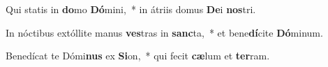 \item Qui statis in \textbf{do}mo \textbf{Dó}mini,~* in átriis domus \textbf{De}i \textbf{nos}tri.
\item In nóctibus extóllite manus \textbf{ves}tras in \textbf{sanc}ta,~* et bene\textbf{dí}cite \textbf{Dó}minum.
\item Benedícat te Dómi\textbf{nus} ex \textbf{Si}on,~* qui fecit \textbf{cæ}lum et \textbf{ter}ram.
